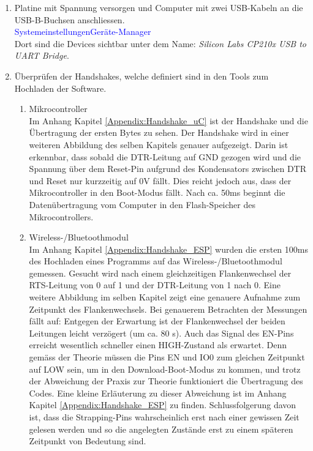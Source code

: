 \begin{enumerate}
\item Platine mit Spannung versorgen und Computer mit zwei USB-Kabeln an die USB-B-Buchsen anschliessen.\\
\textcolor{blue}{Systemeinstellungen\textrightarrow Geräte-Manager}\\
Dort sind die Devices sichtbar unter dem Name: \textit{Silicon Labs CP210x USB to UART Bridge}.\newline
\item Überprüfen der Handshakes, welche definiert sind in den Tools zum Hochladen der Software.\\

\begin{enumerate}
\item Mikrocontroller\\


Im Anhang Kapitel \ref{Appendix:Handshake_uC} ist der Handshake und die Übertragung der ersten Bytes zu sehen. Der Handshake wird in einer weiteren Abbildung des selben Kapitels genauer aufgezeigt. Darin ist erkennbar, dass sobald die DTR-Leitung auf GND gezogen wird und die Spannung über dem Reset-Pin aufgrund des Kondensators zwischen DTR und Reset nur kurzzeitig auf 0V fällt. Dies reicht jedoch aus, dass der Mikrocontroller in den Boot-Modus fällt. Nach ca. 50ms beginnt die Datenübertragung vom Computer in den Flash-Speicher des Mikrocontrollers.\\

\item Wireless-/Bluetoothmodul\\


Im Anhang Kapitel \ref{Appendix:Handshake_ESP} wurden die ersten 100ms des Hochladen eines Programms auf das Wireless-/Bluetoothmodul gemessen. Gesucht wird nach einem gleichzeitigen Flankenwechsel der RTS-Leitung von 0 auf 1 und der DTR-Leitung von 1 nach 0. Eine weitere Abbildung im selben Kapitel zeigt eine genauere Aufnahme zum Zeitpunkt des Flankenwechsels.
Bei genauerem Betrachten der Messungen fällt auf: Entgegen der Erwartung ist der Flankenwechsel der beiden Leitungen leicht verzögert (um ca. 80 \textmu s). Auch das Signal des EN-Pins erreicht wesentlich schneller einen HIGH-Zustand als erwartet. Denn gemäss der Theorie müssen die Pins EN und IO0 zum gleichen Zeitpunkt auf LOW sein, um in den Download-Boot-Modus zu kommen, und trotz der Abweichung der Praxis zur Theorie funktioniert die Übertragung des Codes. Eine kleine Erläuterung zu dieser Abweichung ist im Anhang Kapitel \ref{Appendix:Handshake_ESP} zu finden. Schlussfolgerung davon ist, dass die Strapping-Pins wahrscheinlich erst nach einer gewissen Zeit gelesen werden und so die angelegten Zustände erst zu einem späteren Zeitpunkt von Bedeutung sind.

\end{enumerate}

\end{enumerate}


